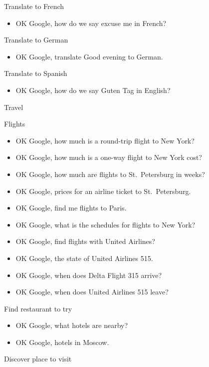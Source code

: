 \documentclass[
  letterpaper,
  DIV=11,
  numbers=noendperiod]{scrartcl}
\providecommand{\tightlist}{%
  \setlength{\itemsep}{0pt}\setlength{\parskip}{0pt}}\usepackage{longtable,booktabs,array}
\begin{document}
Translate to French

\begin{itemize}
\tightlist
\item
  OK Google, how do we say excuse me in French?
\end{itemize}

Translate to German

\begin{itemize}
\tightlist
\item
  OK Google, translate Good evening to German.
\end{itemize}

Translate to Spanish

\begin{itemize}
\tightlist
\item
  OK Google, how do we say Guten Tag in English?
\end{itemize}

Travel

Flights

\begin{itemize}
\item
  OK Google, how much is a round-trip flight to New York?
\item
  OK Google, how much is a one-way flight to New York cost?
\item
  OK Google, how much are flights to St.~Petersburg in weeks?
\item
  OK Google, prices for an airline ticket to St.~Petersburg.
\item
  OK Google, find me flights to Paris.
\item
  OK Google, what is the schedules for flights to New York?
\item
  OK Google, find flights with United Airlines?
\item
  OK Google, the state of United Airlines 515.
\item
  OK Google, when does Delta Flight 315 arrive?
\item
  OK Google, when does United Airlines 515 leave?
\end{itemize}

Find restaurant to try

\begin{itemize}
\item
  OK Google, what hotels are nearby?
\item
  OK Google, hotels in Moscow.
\end{itemize}

Discover place to visit
\end{document}
